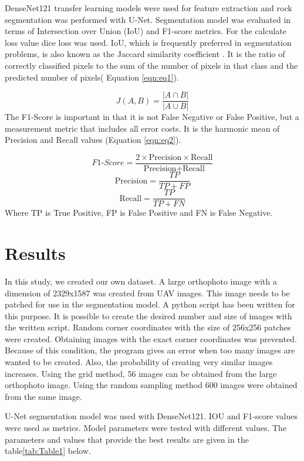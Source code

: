 \documentclass[a4paper,fleqn]{cas-sc}
\begin{document}
DenseNet121 transfer learning models were used for feature extraction and rock segmentation was performed with U-Net. Segmentation model was evaluated in terms of Intersection over Union (IoU) and F1-score metrics. For the calculate loss value dice loss was used. IoU, which is frequently preferred in segmentation problems, is also known as the Jaccard similarity coefficient \citep{jaccard1912distribution}. It is the ratio of correctly classified pixels to the sum of the number of pixels in that class and the predicted number of pixels( Equation \ref{eqn:eq1}). 

\begin{equation}
\label{eqn:eq1}
    J(A,B) = \frac{|A \cap B|}{|A \cup B|}
\end{equation}
The F1-Score is important in that it is not False Negative or False Positive, but a measurement metric that includes all error costs. It is the harmonic mean of Precision and Recall values (Equation \ref{eqn:eq2}).

\begin{equation}
\label{eqn:eq2}
F1\text{-}Score = \frac{2 \times \text{Precision} \times \text{Recall}}{\text{Precision} + \text{Recall}}
\end{equation}
\[
\text{Precision} = \frac{TP}{TP + FP}
\]
\[
\text{Recall} = \frac{TP}{TP + FN}
\]
Where TP is True Positive, FP is False Positive and FN is False Negative.


\section{Results}
In this study, we created our own dataset. A large orthophoto image with a dimension of 2329x1587 was created from UAV images. This image needs to be patched for use in the segmentation model. A python script has been written for this purpose. It is possible to create the desired number and size of images with the written script. Random corner coordinates with the size of 256x256 patches were created. Obtaining images with the exact corner coordinates was prevented. Because of this condition, the program gives an error when too many images are wanted to be created. Also, the probability of creating very similar images increases. Using the grid method, 56 images can be obtained from the large orthophoto image. Using the random sampling method 600 images were obtained from the same image.

U-Net segmentation model was used with DenseNet121. IOU and F1-score values were used as metrics. Model parameters were tested with different values. The parameters and values that provide the best results are given in the table\ref{tab:Table1} below.
\end{document}
